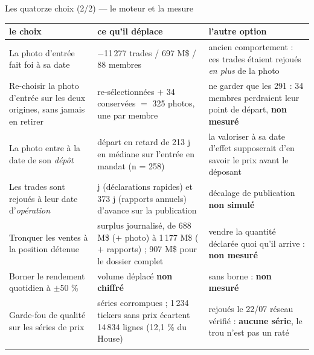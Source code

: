 \documentclass[11pt,aspectratio=169]{beamer}
\newcommand{\defl}[1]{{\scriptsize\color{black!55}#1}}
\begin{document}
\begin{frame}{Les quatorze choix (2/2) --- le moteur et la mesure}
  \vspace{0pt}
  {\scriptsize
  \begin{tabular}{@{}>{\raggedright\arraybackslash}p{}>{\raggedright\arraybackslash}p{}>{\raggedright\arraybackslash}p{}@{}}
    \toprule
    \textbf{le choix} & \textbf{ce qu'il déplace} & \textbf{l'autre option}\\
    \midrule
    La photo d'entrée fait foi à sa date
      & $-$11\,277 trades / 697 M\$ / 88 membres
      & ancien comportement : ces trades étaient rejoués \emph{en plus} de la photo\\\addlinespace[0.6mm]
    Re-choisir la photo d'entrée sur les deux origines, sans jamais en retirer
      & 291 re-sélectionnées $+$ 34 conservées $=$ 325 photos, une par membre
      & ne garder que les 291 : 34 membres perdraient leur point de départ, \textbf{non mesuré}\\\addlinespace[0.6mm]
    La photo entre à la date de son \emph{dépôt}
      & départ en retard de 213 j en médiane sur l'entrée en mandat \defl{(n = 258)}
      & la valoriser à sa date d'effet supposerait d'en savoir le prix avant le déposant\\\addlinespace[0.6mm]
    Les trades sont rejoués à leur date d'\emph{opération}
      & 27 j (déclarations rapides) et 373 j (rapports annuels) d'avance sur la publication
      & décalage de publication \textbf{non simulé}\\\addlinespace[0.6mm]
    Tronquer les ventes à la position détenue
      & surplus journalisé, de 688 M\$ ($+$ photo) à 1\,177 M\$ ($+$ rapports) ;
        907 M\$ pour le dossier complet
      & vendre la quantité déclarée quoi qu'il arrive : \textbf{non mesuré}\\\addlinespace[0.6mm]
    Borner le rendement quotidien à $\pm$50 \%
      & volume déplacé \textbf{non chiffré}
      & sans borne : \textbf{non mesuré}\\\addlinespace[0.6mm]
    Garde-fou de qualité sur les séries de prix
      & 80 séries corrompues ; 1\,234 tickers sans prix écartent 14\,834 lignes
        \defl{(12,1 \% du House)}
      & rejoués le 22/07 réseau vérifié : \textbf{aucune série}, le trou n'est pas un raté\\\addlinespace[0.6mm]
    \bottomrule
  \end{tabular}}
\end{frame}
\end{document}
